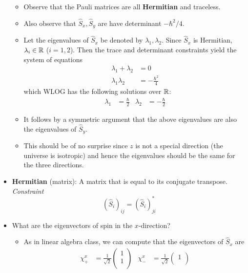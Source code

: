 \documentclass[../notes.tex]{subfiles}
\begin{document}
\begin{itemize}
\begin{itemize}
        \item Observe that the Pauli matrices are all \textbf{Hermitian} and traceless.
        \item Also observe that $\hat{S}_x,\hat{S}_y$ are have determinant $-\hbar^2/4$.
        \item Let the eigenvalues of $\hat{S}_x$ be denoted by $\lambda_1,\lambda_2$. Since $\hat{S}_x$ is Hermitian, $\lambda_i\in\mathbb{R}$ ($i=1,2$). Then the trace and determinant constraints yield the system of equations
        \begin{align*}
            \lambda_1+\lambda_2 &= 0\\
            \lambda_1\lambda_2 &= -\frac{\hbar^2}{4}
        \end{align*}
        which WLOG has the following solutions over $\mathbb{R}$:
        \begin{align*}
            \lambda_1 &= \frac{\hbar}{2}&
            \lambda_2 &= -\frac{\hbar}{2}
        \end{align*}
        \item It follows by a symmetric argument that the above eigenvalues are also the eigenvalues of $\hat{S}_y$.
        \item This should be of no surprise since $z$ is not a special direction (the universe is isotropic) and hence the eigenvalues should be the same for the three directions.
    \end{itemize}
    \item \textbf{Hermitian} (matrix): A matrix that is equal to its conjugate transpose. \emph{Constraint}
    \begin{equation*}
        (\hat{S}_i)_{ij} = (\hat{S}_i)_{ji}^*
    \end{equation*}
    \item What are the eigenvectors of spin in the $x$-direction?
    \begin{itemize}
        \item As in linear algebra class, we can compute that the eigenvectors of $\hat{S}_x$ are
        \begin{align*}
            \chi_+^x &= \frac{1}{\sqrt{2}}
            \begin{pmatrix}
                1\\
                1\\
            \end{pmatrix}&
            \chi_-^x &= \frac{1}{\sqrt{2}}
            \begin{pmatrix}
                1\\

\end{pmatrix}
\end{align*}
\end{itemize}
\end{itemize}
\end{document}
